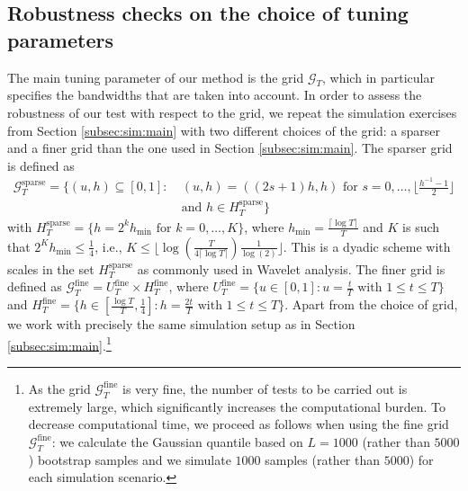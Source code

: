 \documentclass[12pt]{article}
\begin{document}
\subsection{Robustness checks on the choice of tuning parameters}\label{subsec:sim:grid}


The main tuning parameter of our method is the grid $\mathcal{G}_T$, which in particular specifies the bandwidths that are taken into account. In order to assess the robustness of our test with respect to the grid, we repeat the simulation exercises from Section \ref{subsec:sim:main} with two different choices of the grid: a sparser and a finer grid than the one used in Section \ref{subsec:sim:main}.
The sparser grid is defined as
\begin{align}
\mathcal{G}_T^{\text{sparse}} = \big\{ (u,h) \subseteq [0,1]: & \ (u,h) = ((2s+1) h, h) \text{ for } s = 0,\ldots,\Big\lfloor \frac{h^ {-1}-1}{2} \Big\rfloor \nonumber \\ & \ \text{and } h \in H_T^{\text{sparse}} \big\} \label{eq:grid-sparse}
\end{align}
with $H_T^{\text{sparse}} = \{ h = 2^k h_{\min} \text{ for } k=0,\ldots,K \}$, where $h_{\min} = \frac{\lceil \log T \rceil}{T}$ and $K$ is such that $2^K h_{\min} \le \frac{1}{4}$, i.e., $K \le \lfloor \log(\frac{T}{4 \lceil \log T \rceil }) \frac{1}{\log(2)} \rfloor$. This is a dyadic scheme with scales in the set $H_T^{\text{sparse}}$ as commonly used in Wavelet analysis. 
The finer grid is defined as
$\mathcal{G}_T^{\text{fine}} = U_T^{\text{fine}} \times H_T^{\text{fine}}$,
where  
$U_T^{\text{fine}}  = \{ u \in [0,1]: u = \textstyle{\frac{t}{T}} \text{ with } 1 \le t \le T \}$
and
$H_T^{\text{fine}} = \{ h \in [ \textstyle{\frac{\log T}{T}}, \textstyle{\frac{1}{4}} ]:  h = \textstyle{\frac{2t}{T}} \text{ with } 1 \le t \le T \}$. Apart from the choice of grid, we work with precisely the same simulation setup as in Section \ref{subsec:sim:main}.\footnote{As the grid $\mathcal{G}_T^{\text{fine}}$ is very fine, the number of tests to be carried out is extremely large, which significantly increases the computational burden. To decrease computational time, we proceed as follows when using the fine grid $\mathcal{G}_T^{\text{fine}}$:  we calculate the Gaussian quantile based on $L = 1000$ (rather than $5000$) bootstrap samples and we simulate $1000$ samples (rather than $5000$) for each simulation scenario.}
\end{document}

